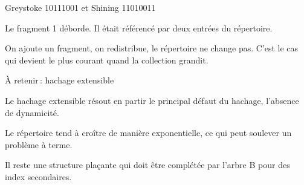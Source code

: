 \begin{frame}{Greystoke 10111001 et Shining 11010011}

Le fragment 1 déborde. Il était référencé par deux entrées du répertoire.

\vfill


\vfill

\begin{blocgauche}
On ajoute un fragment, on redistribue, le répertoire ne change pas. C'est le cas qui devient 
le plus courant quand la collection grandit.
\end{blocgauche}

\end{frame}
\begin{frame}{À retenir\,: hachage extensible}

Le hachage extensible résout en partir le principal
défaut du hachage, l'absence de dynamicité.

\vfill

Le répertoire tend à croître de manière \alert{exponentielle}, ce qui peut soulever un problème
à terme.

\vfill
\begin{blocgauche}
Il reste une structure \alert{plaçante} qui doit être complétée par l'arbre B pour
des index secondaires.
\end{blocgauche}

\end{frame}
